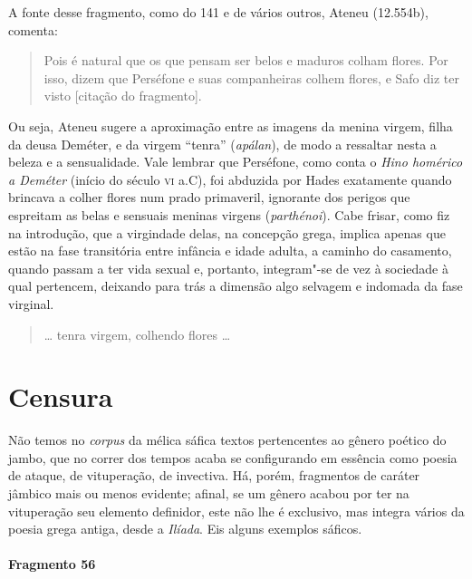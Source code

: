 {{\small A fonte desse fragmento, como do 141 e de vários outros, Ateneu (12.554b), comenta: 

\begin{quote}
Pois é natural
que os que pensam ser belos e maduros colham flores. Por isso, dizem que
Perséfone e suas companheiras colhem flores, e Safo diz ter visto 
[citação do fragmento].
\end{quote}

 Ou seja, Ateneu sugere a aproximação entre as imagens
da menina virgem, filha da deusa Deméter, e da virgem ``tenra”
(\textit{apálan}), de modo a ressaltar nesta a beleza e a
sensualidade. Vale lembrar que Perséfone, como conta o \textit{Hino homérico a Deméter} 
(início do século \textsc{vi} a.C), foi abduzida por Hades exatamente
quando brincava a colher flores num prado primaveril, ignorante dos perigos que
espreitam as belas e sensuais meninas virgens (\textit{parthénoi}). Cabe frisar, como fiz na introdução, que a virgindade delas,
na concepção grega, implica
apenas que estão na fase transitória entre infância e idade
adulta, a caminho do casamento, quando passam a ter vida sexual e, portanto, integram"-se
de vez à sociedade à qual pertencem, deixando para trás a dimensão algo
selvagem e indomada da fase virginal.}

\begin{verse}
\ldots{} tenra virgem, colhendo flores \ldots{}
\end{verse}


\section{Censura}

Não temos no \textit{corpus }da mélica sáfica textos pertencentes ao gênero
poético do jambo, que no correr dos tempos acaba se configurando em essência como poesia de
ataque, de vituperação, de invectiva. Há, porém,
fragmentos de caráter jâmbico mais ou menos evidente; afinal, se um gênero
acabou por ter na vituperação seu elemento definidor, este não lhe é exclusivo,
mas integra vários da poesia grega antiga, desde a \textit{Ilíada}. Eis
alguns exemplos sáficos.

\paragraph{Fragmento 56}

}
